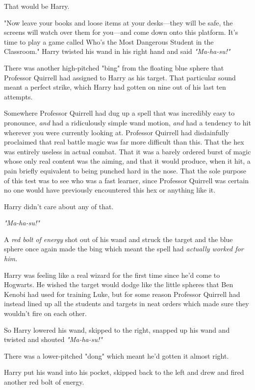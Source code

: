 That would be Harry.

"Now leave your books and loose items at your desks---they will be safe, the
screens will watch over them for you---and come down onto this platform. It's
time to play a game called Who's the Most Dangerous Student in the Classroom."
\sbreak
Harry twisted his wand in his right hand and said \emph{"Ma-ha-su!"}

There was another high-pitched "bing" from the floating blue sphere that
Professor Quirrell had assigned to Harry as his target. That particular sound
meant a perfect strike, which Harry had gotten on nine out of his last ten
attempts.

Somewhere Professor Quirrell had dug up a spell that was incredibly easy to
pronounce, \emph{and} had a ridiculously simple wand motion, \emph{and} had a
tendency to hit wherever you were currently looking at. Professor Quirrell had
disdainfully proclaimed that real battle magic was far more difficult than
this. That the hex was entirely useless in actual combat. That it was a barely
ordered burst of magic whose only real content was the aiming, and that it
would produce, when it hit, a pain briefly equivalent to being punched hard in
the nose. That the sole purpose of this test was to see who was a fast learner,
since Professor Quirrell was certain no one would have previously encountered
this hex or anything like it.

Harry didn't care about any of that.

\emph{"Ma-ha-su!"}

A \emph{red bolt of energy} shot out of his wand and struck the target and the
blue sphere once again made the bing which meant the spell had \emph{actually
worked for him.}

Harry was feeling like a real wizard for the first time since he'd come to
Hogwarts. He wished the target would dodge like the little spheres that Ben
Kenobi had used for training Luke, but for some reason Professor Quirrell had
instead lined up all the students and targets in neat orders which made sure
they wouldn't fire on each other.

So Harry lowered his wand, skipped to the right, snapped up his wand and
twisted and shouted \emph{"Ma-ha-su!"}

There was a lower-pitched "dong" which meant he'd gotten it almost right.

Harry put his wand into his pocket, skipped back to the left and drew and fired
another red bolt of energy.

